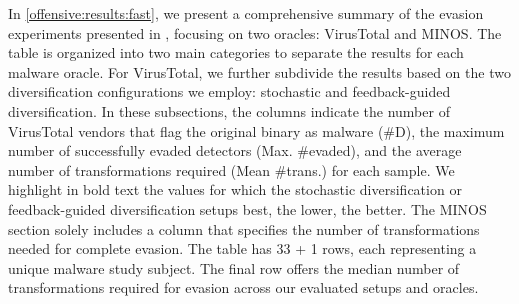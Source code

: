 
In \autoref{offensive:results:fast}, we present a comprehensive summary of the evasion experiments presented in \cite{EVASION}, focusing on two oracles: VirusTotal and MINOS\cite{MINOS}. 
The table is organized into two main categories to separate the results for each malware oracle. 
For VirusTotal, we further subdivide the results based on the two diversification configurations we employ: stochastic and feedback-guided diversification. 
In these subsections, the columns indicate the number of VirusTotal vendors that flag the original binary as malware (\#D), the maximum number of successfully evaded detectors (Max. \#evaded), and the average number of transformations required (Mean \#trans.) for each sample. 
We highlight in bold text the values for which the stochastic diversification or feedback-guided diversification setups best, the lower, the better.
The MINOS section solely includes a column that specifies the number of transformations needed for complete evasion. 
The table has 33 + 1 rows, each representing a unique \Wasm malware study subject. 
The final row offers the median number of transformations required for evasion across our evaluated setups and oracles. 

